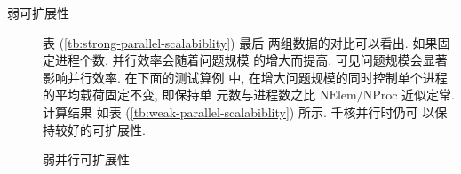 \begin{description}
\begin{figure}
    \label{fig:parallel-efficiency-compare}
  \end{figure}
\item[弱可扩展性] 表 (\ref{tb:strong-parallel-scalabiblity}) 最后
  两组数据的对比可以看出. 如果固定进程个数, 并行效率会随着问题规模
  的增大而提高. 可见问题规模会显著影响并行效率. 在下面的测试算例
  中, 在增大问题规模的同时控制单个进程的平均载荷固定不变, 即保持单
  元数与进程数之比 $\mbox{NElem}/\mbox{NProc}$ 近似定常.  计算结果
  如表 (\ref{tb:weak-parallel-scalabiblity}) 所示. 千核并行时仍可
  以保持较好的可扩展性.
  \begin{center}
    \scriptsize
    \begin{table}
      
      \caption{弱并行可扩展性}
      \label{tb:weak-parallel-scalabiblity}
    \end{table}
  \end{center}
\end{description}
